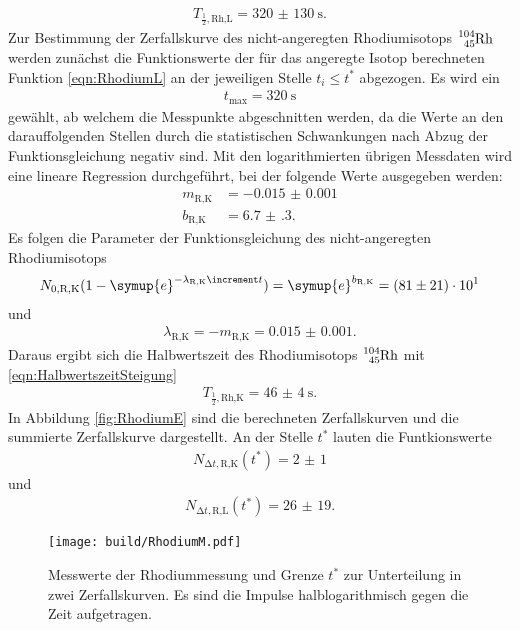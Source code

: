 \begin{align}
  T_{\frac{1}{2},\text{Rh,L}} = \SI{320(130)}{\second}.
\end{align}
Zur Bestimmung der Zerfallskurve des nicht-angeregten Rhodiumisotops
$\ce{^{104}_{45}Rh}$ werden zunächst die Funktionswerte der für das angeregte
Isotop berechneten Funktion \eqref{eqn:RhodiumL} an der jeweiligen Stelle
$t_i \leq t^*$
abgezogen.
Es wird ein
\begin{align}
  t_\text{max} = \SI{320}{\second}
\end{align}
gewählt, ab welchem die Messpunkte abgeschnitten werden, da die Werte an den
darauffolgenden Stellen durch die statistischen Schwankungen nach Abzug
der Funktionsgleichung negativ sind.
Mit den logarithmierten übrigen Messdaten wird eine lineare Regression
durchgeführt, bei der folgende Werte ausgegeben werden:
\begin{align}
  m_\text{R,K} & = -\num{0.015(1)} \\
  b_\text{R,K} & = \num{6.7(3)}.
\end{align}
Es folgen die Parameter der Funktionsgleichung des nicht-angeregten
Rhodiumisotops
\begin{align}
  N_\text{0,R,K}(1-\symup{e}^{-\lambda_\text{R,K}\increment t}) =
  \symup{e}^{b_\text{R,K}} = \num{81(21)e1}
\end{align}
und
\begin{align}
  \lambda_\text{R,K} = -m_\text{R,K} = \num{0.015(1)}.
\end{align}
Daraus ergibt sich die Halbwertszeit des Rhodiumisotops $\ce{^{104}_{45}Rh}$
mit \eqref{eqn:HalbwertszeitSteigung}
\begin{align}
  T_{\frac{1}{2},\text{Rh,K}} = \SI{46(4)}{\second}.
\end{align}
In Abbildung \ref{fig:RhodiumE} sind die berechneten Zerfallskurven und die
summierte Zerfallskurve dargestellt.
An der Stelle $t^*$ lauten die
Funtkionswerte
\begin{align}
  N_{\increment t,\text{R,K}} (t^*) = \num{2(1)}
\end{align}
und
\begin{align}
  N_{\increment t,\text{R,L}} (t^*) = \num{26(19)}.
\end{align}

\begin{figure}
  \centering
  \texttt{[image: build/RhodiumM.pdf]}
  \caption{Messwerte der Rhodiummessung und Grenze $t^*$ zur Unterteilung in
  zwei Zerfallskurven. Es sind die Impulse halblogarithmisch gegen die Zeit
  aufgetragen.}
  \label{fig:RhodiumM}
\end{figure}

